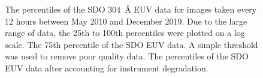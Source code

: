 \documentclass[11pt,a4paper,onecolumn]{report}
\begin{document}
\begin{figure}[t]%
  \qquad
  \qquad

  \caption[]{ The percentiles of the SDO
  \SI{304}{\angstrom} EUV data for images taken every 12 hours between May 2010
  and December 2019. Due to the large range of data, the 25th to 100th
  percentiles were plotted on a log scale.  The 75th
  percentile of the SDO EUV data. A simple threshold was used to remove poor
  quality data.  The percentiles of the SDO
  EUV data after accounting for instrument degradation.}
  \label{fig:aia_data_prep}
\end{figure}
\end{document}
